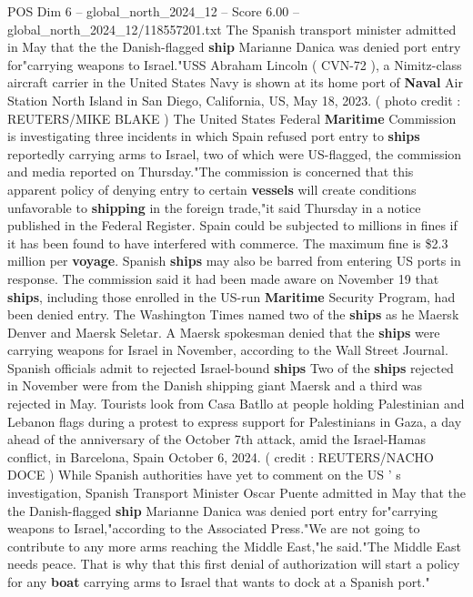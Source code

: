 \begin{textsample}{POS Dim 6 – global\_north\_2024\_12 – Score 6.00 – global\_north\_2024\_12/118557201.txt}  \label{ex:f6_pos_262}
The Spanish transport minister admitted in May that the the Danish-flagged \textbf{ship} Marianne Danica was denied port entry for"carrying weapons to Israel."USS Abraham Lincoln ( CVN-72 ), a Nimitz-class aircraft carrier in the United States Navy is shown at its home port of \textbf{Naval} Air Station North Island in San Diego, California, US, May 18, 2023. ( photo credit : REUTERS/MIKE BLAKE ) The United States Federal \textbf{Maritime} Commission is investigating three incidents in which Spain refused port entry to \textbf{ships} reportedly carrying arms to Israel, two of which were US-flagged, the commission and media reported on Thursday."The commission is concerned that this apparent policy of denying entry to certain \textbf{vessels} will create conditions unfavorable to \textbf{shipping} in the foreign trade,"it said Thursday in a notice published in the Federal Register.
Spain could be subjected to millions in fines if it has been found to have interfered with commerce.
The maximum fine is \$2.3 million per \textbf{voyage}.
Spanish \textbf{ships} may also be barred from entering US ports in response.
The commission said it had been made aware on November 19 that \textbf{ships}, including those enrolled in the US-run \textbf{Maritime} Security Program, had been denied entry.
The Washington Times named two of the \textbf{ships} as he Maersk Denver and Maersk Seletar.
A Maersk spokesman denied that the \textbf{ships} were carrying weapons for Israel in November, according to the Wall Street Journal.
Spanish officials admit to rejected Israel-bound \textbf{ships} Two of the \textbf{ships} rejected in November were from the Danish shipping giant Maersk and a third was rejected in May.
Tourists look from Casa Batllo at people holding Palestinian and Lebanon flags during a protest to express support for Palestinians in Gaza, a day ahead of the anniversary of the October 7th attack, amid the Israel-Hamas conflict, in Barcelona, Spain October 6, 2024. ( credit : REUTERS/NACHO DOCE ) While Spanish authorities have yet to comment on the US ' s investigation, Spanish Transport Minister Oscar Puente admitted in May that the the Danish-flagged \textbf{ship} Marianne Danica was denied port entry for"carrying weapons to Israel,"according to the Associated Press."We are not going to contribute to any more arms reaching the Middle East,"he said."The Middle East needs peace.
That is why that this first denial of authorization will start a policy for any \textbf{boat} carrying arms to Israel that wants to dock at a Spanish port."

\end{textsample}
